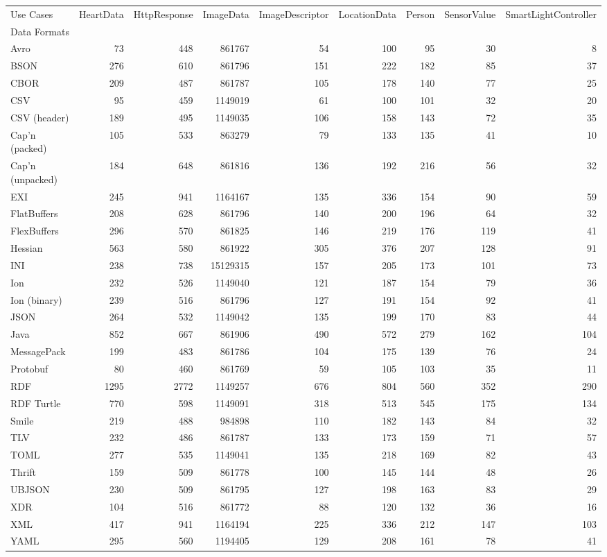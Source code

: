 \begin{tabular}{lrrrrrrrr}
Use Cases & HeartData & HttpResponse & ImageData & ImageDescriptor & LocationData & Person & SensorValue & SmartLightController \\
Data Formats &  &  &  &  &  &  &  &  \\
Avro & 73 & 448 & 861767 & 54 & 100 & 95 & 30 & 8 \\
BSON & 276 & 610 & 861796 & 151 & 222 & 182 & 85 & 37 \\
CBOR & 209 & 487 & 861787 & 105 & 178 & 140 & 77 & 25 \\
CSV & 95 & 459 & 1149019 & 61 & 100 & 101 & 32 & 20 \\
CSV (header) & 189 & 495 & 1149035 & 106 & 158 & 143 & 72 & 35 \\
Cap'n (packed) & 105 & 533 & 863279 & 79 & 133 & 135 & 41 & 10 \\
Cap'n (unpacked) & 184 & 648 & 861816 & 136 & 192 & 216 & 56 & 32 \\
EXI & 245 & 941 & 1164167 & 135 & 336 & 154 & 90 & 59 \\
FlatBuffers & 208 & 628 & 861796 & 140 & 200 & 196 & 64 & 32 \\
FlexBuffers & 296 & 570 & 861825 & 146 & 219 & 176 & 119 & 41 \\
Hessian & 563 & 580 & 861922 & 305 & 376 & 207 & 128 & 91 \\
INI & 238 & 738 & 15129315 & 157 & 205 & 173 & 101 & 73 \\
Ion & 232 & 526 & 1149040 & 121 & 187 & 154 & 79 & 36 \\
Ion (binary) & 239 & 516 & 861796 & 127 & 191 & 154 & 92 & 41 \\
JSON & 264 & 532 & 1149042 & 135 & 199 & 170 & 83 & 44 \\
Java & 852 & 667 & 861906 & 490 & 572 & 279 & 162 & 104 \\
MessagePack & 199 & 483 & 861786 & 104 & 175 & 139 & 76 & 24 \\
Protobuf & 80 & 460 & 861769 & 59 & 105 & 103 & 35 & 11 \\
RDF & 1295 & 2772 & 1149257 & 676 & 804 & 560 & 352 & 290 \\
RDF Turtle & 770 & 598 & 1149091 & 318 & 513 & 545 & 175 & 134 \\
Smile & 219 & 488 & 984898 & 110 & 182 & 143 & 84 & 32 \\
TLV & 232 & 486 & 861787 & 133 & 173 & 159 & 71 & 57 \\
TOML & 277 & 535 & 1149041 & 135 & 218 & 169 & 82 & 43 \\
Thrift & 159 & 509 & 861778 & 100 & 145 & 144 & 48 & 26 \\
UBJSON & 230 & 509 & 861795 & 127 & 198 & 163 & 83 & 29 \\
XDR & 104 & 516 & 861772 & 88 & 120 & 132 & 36 & 16 \\
XML & 417 & 941 & 1164194 & 225 & 336 & 212 & 147 & 103 \\
YAML & 295 & 560 & 1194405 & 129 & 208 & 161 & 78 & 41 \\
\end{tabular}
